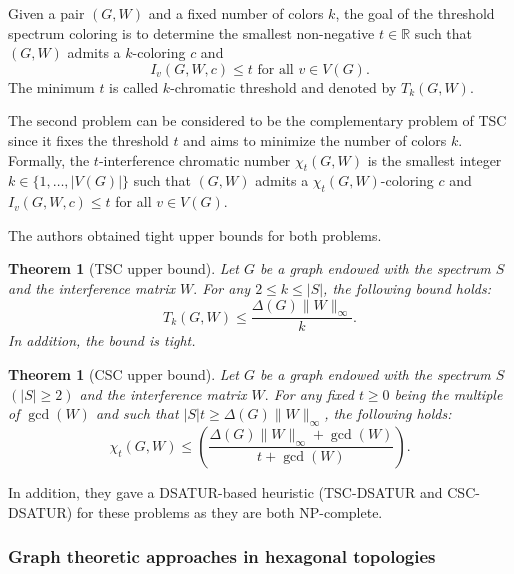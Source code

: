 \documentclass[a4paper, 12pt]{article}
\newtheorem{theo}[lem]{Theorem}
\begin{document}
Given a pair $(G,W)$ and a fixed number of colors $k$, the goal of the threshold spectrum coloring is to determine the smallest non-negative $t \in \mathbb{R}$ such that $(G,W)$ admits a $k$-coloring $c$ and 
$$I_v(G,W,c) \leqslant t \text{ for all } v \in V(G).$$
The minimum $t$ is called $k$-chromatic threshold and denoted by $T_k(G,W)$.

The second problem can be considered to be the complementary problem of TSC since it fixes the threshold $t$ and aims to minimize the number of colors $k$. Formally, the $t$-interference chromatic number $\chi_t(G,W)$ is the smallest integer $k \in \lbrace 1,\ldots, |V(G)| \rbrace$ such that $(G,W)$ admits a $\chi_t(G,W)$-coloring $c$ and $I_v(G,W,c) \leqslant t$ for all $v \in V(G)$.

The authors obtained tight upper bounds for both problems.

\begin{theo}[TSC upper bound]
Let $G$ be a graph endowed with the spectrum $S$ and the interference matrix $W.$ For any $2 \leqslant k \leqslant |S|$, the following bound holds:
$$T_k(G,W) \leqslant \frac{\Delta(G) \| W \|_{\infty}}{k}.$$
In addition, the bound is tight.
\end{theo}

\begin{theo}[CSC upper bound]
Let $G$ be a graph endowed with the spectrum $S$ $(|S| \geqslant 2)$ and the interference matrix $W.$ For any fixed $t \geqslant 0$ being the multiple of $\gcd(W)$ and such that $|S|t \geqslant \Delta(G) \| W \|_{\infty}$, the following holds:
$$\chi_t(G,W) \leqslant \left( \frac{\Delta(G) \| W \|_\infty + \gcd(W)}{t + \gcd(W)} \right).$$
\end{theo}

In addition, they gave a DSATUR-based heuristic (TSC-DSATUR and CSC-DSATUR) for these problems as they are both NP-complete.

\subsubsection{Graph theoretic approaches in hexagonal topologies}\label{sec:hex-topo}
\end{document}
